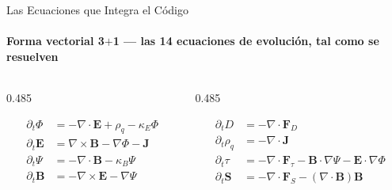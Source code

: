 \documentclass[aspectratio=169,9pt]{beamer}
\begin{document}
\begin{frame}{Las Ecuaciones que Integra el C\'odigo}
\framesubtitle{Forma vectorial 3$+$1 --- las \textbf{14} ecuaciones de evoluci\'on, tal como se resuelven}
\vspace{-0.10cm}
\begin{columns}[T]
\begin{column}{0.485\textwidth}
  \begin{tcolorbox}[EQ={Maxwell aumentado --- GLM \quad(8 comp.)}]
    \footnotesize
    \vspace{0.04cm}
    \[
      \begin{aligned}
        \partial_t\Phi        &= -\nabla\!\cdot\!\mathbf{E}+\rho_q-\kappa_E\Phi\\
        \partial_t\mathbf{E}  &= \nabla\times\mathbf{B}-\nabla\Phi-\mathbf{J}\\
        \partial_t\Psi        &= -\nabla\!\cdot\!\mathbf{B}-\kappa_B\Psi\\
        \partial_t\mathbf{B}  &= -\nabla\times\mathbf{E}-\nabla\Psi
      \end{aligned}
    \]
    \vspace{-0.30cm}
  \end{tcolorbox}
\end{column}
\begin{column}{0.485\textwidth}
  \begin{tcolorbox}[EQ={Fluido y carga \quad(6 comp.)}]
    \footnotesize
    \vspace{0.04cm}
    \[
      \begin{aligned}
        \partial_t D       &= -\nabla\!\cdot\!\mathbf{F}_D\\
        \partial_t \rho_q  &= -\nabla\!\cdot\!\mathbf{J}\\
        \partial_t \tau    &= -\nabla\!\cdot\!\mathbf{F}_\tau
                              -\mathbf{B}\!\cdot\!\nabla\Psi
                              -\mathbf{E}\!\cdot\!\nabla\Phi\\
        \partial_t \mathbf{S} &= -\nabla\!\cdot\!\mathbf{F}_S
                              -(\nabla\!\cdot\!\mathbf{B})\mathbf{B}
      \end{aligned}
    \]
    \vspace{-0.30cm}
  \end{tcolorbox}
\end{column}
\end{columns}


\end{frame}
\end{document}
